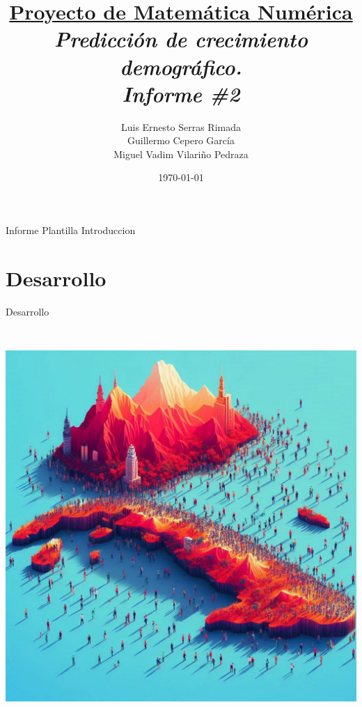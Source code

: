 \documentclass{article}
\title{\textbf{\underline{Proyecto de Matemática Numérica}} \\ \textit{Predicción de crecimiento demográfico.} \\ \textit{Informe \#2}}
\author{Luis Ernesto Serras Rimada \\ Guillermo Cepero García \\ Miguel Vadim Vilariño Pedraza}
\date{\today}
\begin{document}
\maketitle
    Informe Plantilla
    \tableofcontents
    \lstlistoflistings
    Introduccion
\newpage
\section{Desarrollo}
Desarrollo\\
\begin{center}
\includegraphics[height = 15cm]{img/cuba3.jpeg}
\end{center}
\newpage
\end{document}
